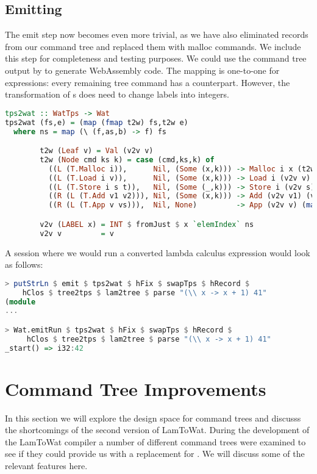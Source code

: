 \subsection{\label{subsection:emit2}Emitting}
The emit step now becomes even more trivial, as we have also eliminated records from our command tree and replaced them with malloc commands. We include this step for completeness and testing purposes. We could use the command tree output by  to generate WebAssembly code. The mapping is one-to-one for expressions: every remaining tree command has a  counterpart. However, the transformation of s does need to change labels into integers.

\begin{lstlisting}[language=Haskell]
tps2wat :: WatTps -> Wat
tps2wat (fs,e) = (map (fmap t2w) fs,t2w e)
  where ns = map (\ (f,as,b) -> f) fs

        t2w (Leaf v) = Val (v2v v)
        t2w (Node cmd ks k) = case (cmd,ks,k) of
          ((L (T.Malloc i)),      Nil, (Some (x,k))) -> Malloc i x (t2w k)
          ((L (T.Load i v)),      Nil, (Some (x,k))) -> Load i (v2v v) x (t2w k)
          ((L (T.Store i s t)),   Nil, (Some (_,k))) -> Store i (v2v s) (v2v t) (t2w k)
          ((R (L (T.Add v1 v2))), Nil, (Some (x,k))) -> Add (v2v v1) (v2v v2) x (t2w k)
          ((R (L (T.App v vs))),  Nil, None)         -> App (v2v v) (map v2v vs)

        v2v (LABEL x) = INT $ fromJust $ x `elemIndex` ns
        v2v v         = v
\end{lstlisting}

A  session where we would run a converted lambda calculus expression would look as follows:

\begin{lstlisting}[language=Haskell]
> putStrLn $ emit $ tps2wat $ hFix $ swapTps $ hRecord $
    hClos $ tree2tps $ lam2tree $ parse "(\\ x -> x + 1) 41"
(module
...

> Wat.emitRun $ tps2wat $ hFix $ swapTps $ hRecord $
     hClos $ tree2tps $ lam2tree $ parse "(\\ x -> x + 1) 41"
_start() => i32:42
\end{lstlisting}

\section{\label{section:ctreebetter}Command Tree Improvements}
In this section we will explore the design space for command trees and discusss the shortcomings of the second version of LamToWat. During the development of the LamToWat compiler a number of different command trees were examined to see if they could provide us with a replacement for . We will discuss some of the relevant features here.

